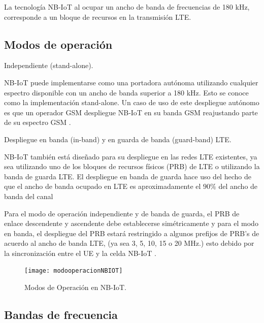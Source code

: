 La tecnología NB-IoT al ocupar un ancho de banda de frecuencias de 180 kHz, corresponde a un bloque de recursos en la transmisión LTE. \newline

\subsection{Modos de operación}

Independiente (stand-alone).\newline

NB-IoT puede implementarse como una portadora autónoma utilizando cualquier espectro disponible con un ancho de banda superior a 180 kHz. Esto se conoce como la implementación stand-alone. Un caso de uso de este despliegue autónomo es que un operador GSM despliegue NB-IoT en su banda GSM reajustando parte de su espectro GSM \parencite{Liberg2018}.\newline

Despliegue en banda (in-band) y en guarda de banda (guard-band) LTE.\newline

NB-IoT también está diseñado para su despliegue en las redes LTE existentes, ya sea utilizando uno de los bloques de recursos físicos (PRB) de LTE o utilizando la banda de guarda LTE. El despliegue en banda de guarda hace uso del hecho de que el ancho de banda ocupado en LTE es aproximadamente el $90\%$ del ancho de banda del canal\newline

Para el modo de operación independiente y de banda de guarda, el PRB de enlace descendente y ascendente debe establecerse simétricamente y para el modo en banda, el despliegue del PRB estará restringido a algunos prefijos de PRB’s de acuerdo al ancho de banda LTE, (ya sea 3, 5, 10, 15 o 20 MHz.) esto debido por la sincronización entre el UE y la celda NB-IoT \parencite{NBIoTDeploymentGSMA}.\newline

\begin{figure}[th]
    \centering
    \texttt{[image: modooperacionNBIOT]}
    \decoRule
    \caption[Modos de Operación en NB-IoT.]{Modos de Operación en NB-IoT. \parencite{Liberg2018}}
    \label{fig:NBIoT2}
\end{figure}

\subsection{Bandas de frecuencia}


